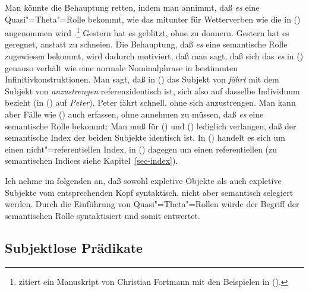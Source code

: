 \noindent
Man könnte die Behauptung retten, indem man annimmt, daß \emph{es} eine
Quasi"=Theta"=Rolle bekommt, wie das mitunter für
Wetterverben wie die in () angenommen wird
  \citep[--327]{Chomsky93a}\nocite{Chomsky81a}.\footnote{ 
  \citet{Berman99a} zitiert ein Manuskript von Christian Fortmann 
  mit den Beispielen in ().%
}
\eal
\ex Gestern hat es geblitzt, ohne zu donnern.
\ex Gestern hat es geregnet, anstatt zu schneien.
\zl
Die Behauptung, daß \emph{es} eine semantische Rolle zugewiesen bekommt, wird dadurch
motiviert, daß man sagt, daß sich das \emph{es} in () genauso verhält wie eine
normale Nominalphrase in bestimmten Infinitivkonstruktionen.
Man sagt, daß in () das Subjekt von \emph{fährt} mit dem Subjekt von \emph{anzustrengen}
referenzidentisch ist, sich also auf dasselbe Individuum bezieht (in () auf \emph{Peter}).
\ea
Peter fährt schnell, ohne sich anzustrengen.
\z
Man kann aber Fälle wie () auch erfassen, ohne annehmen
zu müssen, daß \emph{es} eine semantische Rolle bekommt: Man muß für () und ()
lediglich verlangen, daß der semantische Index der beiden
Subjekte identisch ist. In () handelt es sich um einen
nicht"=referentiellen Index, in () dagegen um einen referentiellen 
(zu semantischen Indices siehe Kapitel~\ref{sec-index}).

Ich nehme im folgenden an, daß sowohl expletive Objekte als auch expletive Subjekte
vom entsprechenden Kopf syntaktisch, nicht aber semantisch selegiert werden.
Durch die Einführung von Quasi"=Theta"=Rollen würde der Begriff der semantischen Rolle 
syntaktisiert\label{page-syntaktisierung} und somit entwertet.

\subsection{Subjektlose Prädikate}
\label{sec-subjekt-valenz}

